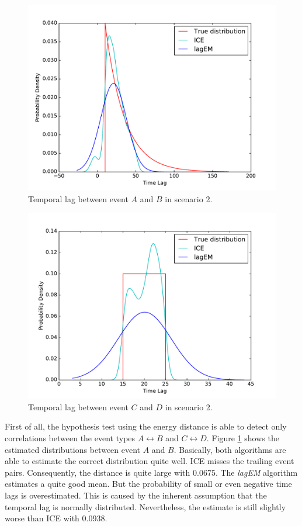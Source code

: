 \documentclass[conference]{IEEEtran}
\theoremstyle{examplestyle}
\begin{document}
\begin{figure}[!htb]
	\centering
	\includegraphics[scale=0.4]{images/scenarios/2-AB.pdf}
	\caption{Temporal lag between event \(A\) and \(B\) in scenario 2.}
	\label{fig:scen2-1}	
\end{figure}

\begin{figure}[!htb]
	\centering
	\includegraphics[scale=0.4]{images/scenarios/2-CD.pdf}
	\caption{Temporal lag between event \(C\) and \(D\) in scenario 2.}
	\label{fig:scen2-2}	
\end{figure}

First of all, the hypothesis test using the energy distance is able to detect only correlations between the event types \(A \leftrightarrow B\) and \(C \leftrightarrow D\). Figure \ref{fig:scen2-1} shows the estimated distributions between event \(A\) and \(B\). Basically, both algorithms are able to estimate the correct distribution quite well. \ac{ICE} misses the trailing event pairs. Consequently, the distance is quite large with 0.0675. The \textit{lagEM} algorithm estimates a quite good mean. But the probability of small or even negative time lags is overestimated. This is caused by the inherent assumption that the temporal lag is normally distributed. Nevertheless, the estimate is still slightly worse than \ac{ICE} with 0.0938.
\end{document}
